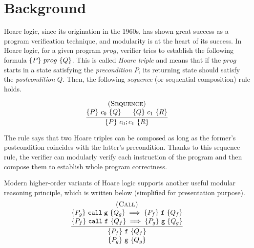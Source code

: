 \section{Background}
\label{sec:program:background}

Hoare logic, since its origination in the 1960s, has shown great success as a program verification technique, and modularity is at the heart of its success.
In Hoare logic, for a given program $prog$, verifier tries to establish the following formula $\{{P}\}~{prog}~\{{Q}\}$.
This is called {\it Hoare triple} and means that if the $prog$ starts in a state satisfying the {\it precondition} $P$,
its returning state should satisfy the {\it postcondition} $Q$.
Then, the following {\it sequence} (or sequential composition) rule holds.

\[
\infer
    {\hoare{P}{c_{0} ; c_{1}}{R}}
    {\deduce{\hoare{P}{c_{0}}{Q} \;\;\;\;\;\; \hoare{Q}{c_{1}}{R}}
      {\textsc{(Sequence)}}}
\]

\noindent The rule says that two Hoare triples can be composed as long as the former's postcondition coincides with the latter's precondition. Thanks to this sequence rule, the verifier can modularly verify each instruction of the program and then compose them to establish whole program correctness.



Modern higher-order variants of Hoare logic\cite{VST,appel:plcc} supports another useful modular reasoning principle, which is written below (simplified for presentation purpose).%
\[
\infer
    {\deduce{\hoare{P_{g}}{\code{g}}{Q_{g}}}{\hoare{P_{f}}{\code{f}}{Q_{f}}}}
    {\deduce{\hoare{P_{f}}{\code{call} \; \code{f}}{Q_{f}} \implies \hoare{P_{g}}{\code{g}}{Q_{g}}}
            {\deduce{\hoare{P_{g}}{\code{call} \; \code{g}}{Q_{g}} \implies \hoare{P_{f}}{\code{f}}{Q_{f}}}
                    {\textsc{(Call)}}}
    }
\]


